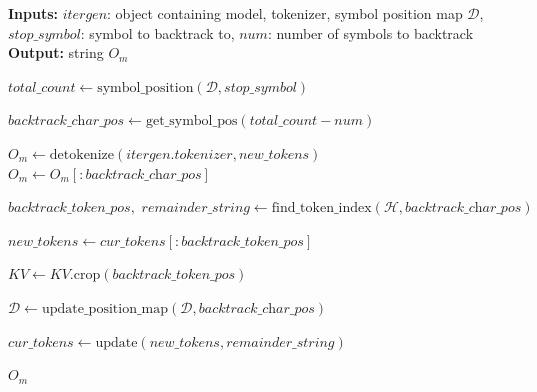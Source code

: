 
\begin{algorithm}
\small
\caption{\Tool{} Backward Function}
\label{alg:backward}

\begin{flushleft}
\textbf{Inputs:} $\textit{itergen}$: object containing model, tokenizer, symbol position map $\mathcal{D}$, \\
$\textit{stop\_symbol}$: symbol to backtrack to, $\textit{num}$: number of symbols to backtrack \\
\textbf{Output:} string $O_m$
\end{flushleft}

\begin{algorithmic}[1]
    \State $\textit{total\_count} \gets \text{symbol\_position}(\mathcal{D}, \textit{stop\_symbol})$
    

    \State $\textit{backtrack\_char\_pos} \gets  \text{get\_symbol\_pos}(\textit{total\_count}-\textit{num})$  

    \State $O_m \gets \text{detokenize}(\textit{itergen.tokenizer}, \textit{new\_tokens})$
    \State $O_m \gets O_m[:\textit{backtrack\_char\_pos}]$
    
    \State $\textit{backtrack\_token\_pos}, \textit{ remainder\_string} \gets \text{find\_token\_index}(\mathcal{H}, \textit{backtrack\_char\_pos})$ 
    
    \State $\textit{new\_tokens} \gets \textit{cur\_tokens}[:\textit{backtrack\_token\_pos}]$  

    \State $KV \gets KV.\text{crop}(\textit{backtrack\_token\_pos})$  

    \State $\mathcal{D} \gets \text{update\_position\_map}(\mathcal{D}, \textit{backtrack\_char\_pos})$

    \State $\textit{cur\_tokens} \gets \text{update}(\textit{new\_tokens}, \textit{remainder\_string})$
    
    \State \Return $O_m$
\EndFunction
\end{algorithmic}
\end{algorithm}
